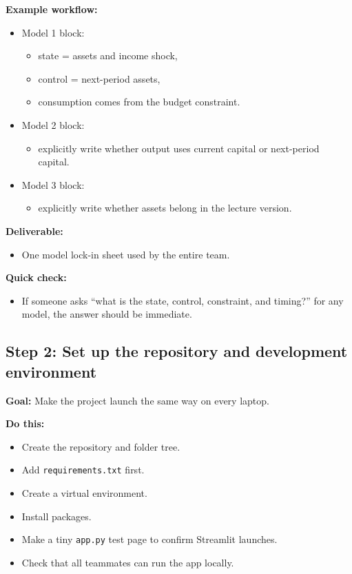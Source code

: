 \documentclass[11pt]{article}
\begin{document}
\textbf{Example workflow:}
\begin{itemize}
    \item Model 1 block:
    \begin{itemize}
        \item state = assets and income shock,
        \item control = next-period assets,
        \item consumption comes from the budget constraint.
    \end{itemize}
    \item Model 2 block:
    \begin{itemize}
        \item explicitly write whether output uses current capital or next-period capital.
    \end{itemize}
    \item Model 3 block:
    \begin{itemize}
        \item explicitly write whether assets belong in the lecture version.
    \end{itemize}
\end{itemize}

\textbf{Deliverable:}
\begin{itemize}
    \item One model lock-in sheet used by the entire team.
\end{itemize}

\textbf{Quick check:}
\begin{itemize}
    \item If someone asks ``what is the state, control, constraint, and timing?'' for any model, the answer should be immediate.
\end{itemize}

\subsection{Step 2: Set up the repository and development environment}
\textbf{Goal:} Make the project launch the same way on every laptop.

\textbf{Do this:}
\begin{itemize}
    \item Create the repository and folder tree.
    \item Add \verb|requirements.txt| first.
    \item Create a virtual environment.
    \item Install packages.
    \item Make a tiny \verb|app.py| test page to confirm Streamlit launches.
    \item Check that all teammates can run the app locally.
\end{itemize}
\end{document}
